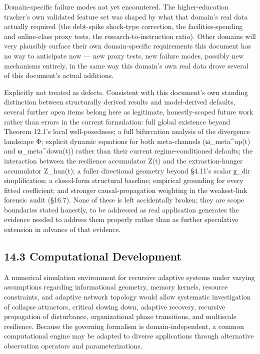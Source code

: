 \documentclass[
]{article}
\begin{document}
Domain-specific failure modes not yet encountered. The higher-education
tracker's own validated feature set was shaped by what that domain's
real data actually required (the debt-spike shock-type correction, the
facilities-spending and online-class proxy tests, the
research-to-instruction ratio). Other domains will very plausibly
surface their own domain-specific requirements this document has no way
to anticipate now --- new proxy tests, new failure modes, possibly new
mechanisms entirely, in the same way this domain's own real data drove
several of this document's actual additions.

Explicitly not treated as defects. Consistent with this document's own
standing distinction between structurally derived results and
model-derived defaults, several further open items belong here as
legitimate, honestly-scoped future work rather than errors in the
current formulation: full global existence beyond Theorem 12.1's local
well-posedness; a full bifurcation analysis of the divergence landscape
Φ; explicit dynamic equations for both meta-channels (ω\_meta\^{}up(t)
and ω\_meta\^{}down(t)) rather than their current regime-conditioned
defaults; the interaction between the resilience accumulator Z(t) and
the extraction-hunger accumulator Z\_hun(t); a fuller directional
geometry beyond §4.11's scalar χ\_dir simplification; a closed-form
structural baseline; empirical grounding for every fitted coefficient;
and stronger causal-propagation weighting in the weakest-link forensic
audit (§16.7). None of these is left accidentally broken; they are scope
boundaries stated honestly, to be addressed as real application
generates the evidence needed to address them properly rather than as
further speculative extension in advance of that evidence.

\hypertarget{computational-development}{%
\subsection{14.3 Computational
Development}\label{computational-development}}

A numerical simulation environment for recursive adaptive systems under
varying assumptions regarding informational geometry, memory kernels,
resource constraints, and adaptive network topology would allow
systematic investigation of collapse attractors, critical slowing down,
adaptive recovery, recursive propagation of disturbance, organizational
phase transitions, and multiscale resilience. Because the governing
formalism is domain-independent, a common computational engine may be
adapted to diverse applications through alternative observation
operators and parameterizations.
\end{document}
